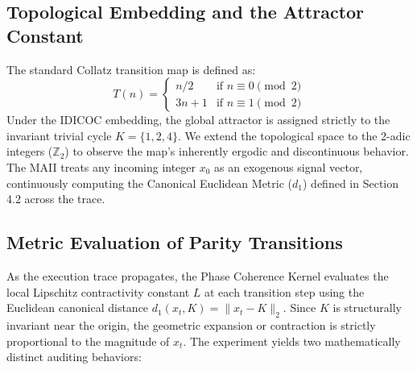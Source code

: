 \documentclass[11pt,a4paper]{article}
\begin{document}
\subsection{Topological Embedding and the Attractor Constant}
The standard Collatz transition map is defined as:
\begin{equation}
    T(n) = \begin{cases} n/2 & \text{if } n \equiv 0 \pmod 2 \\ 3n+1 & \text{if } n \equiv 1 \pmod 2 \end{cases}
\end{equation}
Under the IDICOC embedding, the global attractor is assigned strictly to the invariant trivial cycle $K = \{1, 2, 4\}$. We extend the topological space to the 2-adic integers ($\mathbb{Z}_2$) to observe the map's inherently ergodic and discontinuous behavior. The MAII treats any incoming integer $x_0$ as an exogenous signal vector, continuously computing the Canonical Euclidean Metric ($d_1$) defined in Section 4.2 across the trace.

\subsection{Metric Evaluation of Parity Transitions}
As the execution trace propagates, the Phase Coherence Kernel evaluates the local Lipschitz contractivity constant $L$ at each transition step using the Euclidean canonical distance $d_1(x_t, K) = \|x_t - K\|_2$. Since $K$ is structurally invariant near the origin, the geometric expansion or contraction is strictly proportional to the magnitude of $x_t$. The experiment yields two mathematically distinct auditing behaviors:
\end{document}
